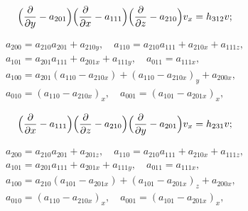 $$


\Bigl ( \frac{\partial}{\partial y}-a_{201} \Bigr )


\Bigl ( \frac{\partial}{\partial x}-a_{111} \Bigr )


\Bigl ( \frac{\partial}{\partial z}-a_{210} \Bigr )


v_{x} = h_{312}v;


$$





\begin{equation}\label{mironov44}


\begin{array}{c}


a_{200}=a_{210}a_{201}+a_{210y},\quad


a_{110}=a_{210}a_{111}+a_{210x}+a_{111z},\\


a_{101}=a_{201}a_{111}+a_{201x}+a_{111y},\quad


a_{011}=a_{111x},\\


a_{100}=a_{201}(a_{110}-a_{210x})+(a_{110}-a_{210x})_{y}+a_{200x},\\


a_{010}=(a_{110}-a_{210x})_{x},\quad a_{001}=(a_{101}-a_{201x})_{x},


\end{array}


\end{equation}


$$


\Bigl ( \frac{\partial}{\partial x}-a_{111} \Bigr )


\Bigl ( \frac{\partial}{\partial z}-a_{210} \Bigr )


\Bigl ( \frac{\partial}{\partial y}-a_{201} \Bigr )


v_{x} = h_{231}v;


$$





\begin{equation}\label{mironov45}


\begin{array}{c}


a_{200}=a_{210}a_{201}+a_{201z},\quad


a_{110}=a_{210}a_{111}+a_{210x}+a_{111z},\\


a_{101}=a_{201}a_{111}+a_{201x}+a_{111y},\quad


a_{011}=a_{111x},\\


a_{100}=a_{210}(a_{101}-a_{201x})+(a_{101}-a_{201x})_{z}+a_{200x},\\


a_{010}=(a_{110}-a_{210x})_{x},\quad a_{001}=(a_{101}-a_{201x})_{x},


\end{array}


\end{equation}


